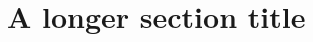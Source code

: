\documentclass{article}
\begin{document}
\tableofcontents
\section[Short]{A longer section title}
\end{document}

